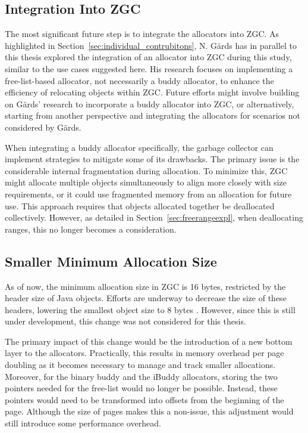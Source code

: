 \subsection{Integration Into ZGC}
The most significant future step is to integrate the allocators into ZGC. As highlighted in Section~\ref{sec:individual_contrubitons}, N. Gärds has in parallel to this thesis explored the integration of an allocator into ZGC during this study, similar to the use cases suggested here. His research focuses on implementing a free-list-based allocator, not necessarily a buddy allocator, to enhance the efficiency of relocating objects within ZGC. Future efforts might involve building on Gärds' research to incorporate a buddy allocator into ZGC, or alternatively, starting from another perspective and integrating the allocators for scenarios not considered by Gärds.

When integrating a buddy allocator specifically, the garbage collector can implement strategies to mitigate some of its drawbacks. The primary issue is the considerable internal fragmentation during allocation. To minimize this, ZGC might allocate multiple objects simultaneously to align more closely with size requirements, or it could use fragmented memory from an allocation for future use. This approach requires that objects allocated together be deallocated collectively. However, as detailed in Section~\ref{sec:freerangeexpl}, when deallocating ranges, this no longer becomes a consideration.

\subsection{Smaller Minimum Allocation Size}
As of now, the minimum allocation size in ZGC is 16 bytes, restricted by the header size of Java objects. Efforts are underway to decrease the size of these headers, lowering the smallest object size to 8 bytes \cite{liliput}. However, since this is still under development, this change was not considered for this thesis.

The primary impact of this change would be the introduction of a new bottom layer to the allocators. Practically, this results in memory overhead per page doubling as it becomes necessary to manage and track smaller allocations. Moreover, for the binary buddy and the iBuddy allocators, storing the two pointers needed for the free-list would no longer be possible. Instead, these pointers would need to be transformed into offsets from the beginning of the page. Although the size of pages makes this a non-issue, this adjustment would still introduce some performance overhead.

